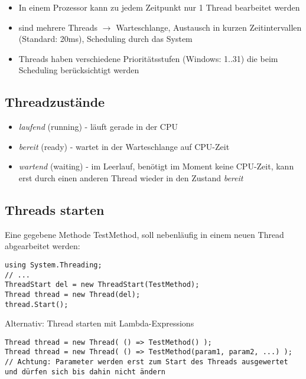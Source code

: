 \begin{itemize}
\item In einem Prozessor kann zu jedem Zeitpunkt nur 1 Thread bearbeitet werden
\item sind mehrere Threads $\to$ Warteschlange, Austausch in kurzen Zeitintervallen (Standard: 20ms), Scheduling durch das System
\item Threads haben verschiedene Prioritätsstufen (Windows: 1..31) die beim Scheduling berücksichtigt werden
\end{itemize}

\subsection{Threadzustände}

\begin{itemize}
\item \emph{laufend} (running) - läuft gerade in der CPU
\item \emph{bereit} (ready) - wartet in der Warteschlange auf CPU-Zeit
\item \emph{wartend} (waiting) - im Leerlauf, benötigt im Moment keine CPU-Zeit, kann erst durch einen anderen Thread wieder in den Zustand \emph{bereit}
\end{itemize}

\subsection{Threads starten}

Eine gegebene Methode TestMethod, soll nebenläufig in einem neuen Thread abgearbeitet werden:

\begin{lstlisting}[language={[Sharp]C}]
using System.Threading;
// ...
ThreadStart del = new ThreadStart(TestMethod);
Thread thread = new Thread(del);
thread.Start();
\end{lstlisting}

Alternativ: Thread starten mit Lambda-Expressions

\begin{lstlisting}[language={[Sharp]C}]
Thread thread = new Thread( () => TestMethod() );
Thread thread = new Thread( () => TestMethod(param1, param2, ...) );
// Achtung: Parameter werden erst zum Start des Threads ausgewertet und dürfen sich bis dahin nicht ändern 
\end{lstlisting}

